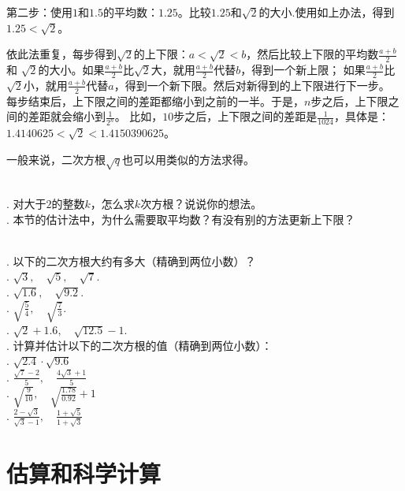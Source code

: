 \documentclass[12pt,UTF8]{ctexbook}
\begin{document}
第二步：使用$1$和$1.5$的平均数：$1.25$。比较$1.25$和$\sqrt{2}$的大小.使用如上办法，得到
$1.25 < \sqrt{2}$。

依此法重复，每步得到$\sqrt{2}$的上下限：$a < \sqrt{2} < b$，然后比较上下限的平均数$\frac{a+b}{2}$和
$\sqrt{2}$的大小。如果$\frac{a+b}{2}$比$\sqrt{2}$大，就用$\frac{a+b}{2}$代替$b$，得到一个新上限；
如果$\frac{a+b}{2}$比$\sqrt{2}$小，就用$\frac{a+b}{2}$代替$a$，得到一个新下限。然后对新得到的上下限进行下一步。
每步结束后，上下限之间的差距都缩小到之前的一半。于是，$n$步之后，上下限之间的差距就会缩小到$\frac{1}{2^n}$。
比如，$10$步之后，上下限之间的差距是$\frac{1}{1024}$，具体是：$1.4140625 < \sqrt{2} < 1.4150390625$。

一般来说，二次方根$\sqrt{q}$也可以用类似的方法求得。
\begin{sk}\label{sk:3-2-0}
    \mbox{}\\
    . 对大于$2$的整数$k$，怎么求$k$次方根？说说你的想法。\\
    . 本节的估计法中，为什么需要取平均数？有没有别的方法更新上下限？
\end{sk}

\begin{xt}\label{xt:3-2-0}
    \mbox{}\\
    . 以下的二次方根大约有多大（精确到两位小数）？\\
    . $\sqrt{3},\quad \sqrt{5},\quad \sqrt{7}$.\\
    . $\sqrt{1.6},\quad \sqrt{9.2}$.\\
    . $\displaystyle\sqrt{\frac{5}{4}}, \quad \sqrt{\frac{7}{3}}$.\\
    . $\sqrt{2} + 1.6,\quad \sqrt{12.5} - 1$.\\
    . 计算并估计以下的二次方根的值（精确到两位小数）：\\
    . $\sqrt{2.4} \cdot \sqrt{9.6}$\\
    . $\displaystyle\frac{\sqrt{7} - 2}{5}, \quad \frac{4\sqrt{3} + 1}{5}$\\
    . $\displaystyle\sqrt{\frac{9}{10}}, \quad\sqrt{\frac{1.78}{0.92}} + 1  $\\
    . $\displaystyle\frac{2 - \sqrt{3}}{\sqrt{3} - 1}, \quad \frac{1 + \sqrt{5}}{1 + \sqrt{3}}$
\end{xt}

\chapter{估算和科学计算}
\end{document}
